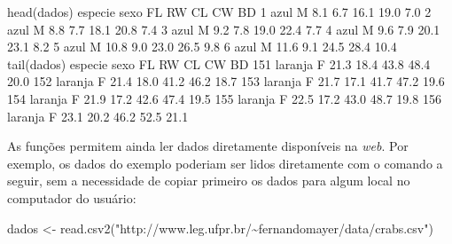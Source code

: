 \documentclass[
  10pt,
  a4paper]{book}
\newenvironment{Shaded}{\begin{snugshade}}{\end{snugshade}}
\newcommand{\DecValTok}[1]{\textcolor[rgb]{0.00,0.00,0.81}{#1}}
\newcommand{\FloatTok}[1]{\textcolor[rgb]{0.00,0.00,0.81}{#1}}
\newcommand{\FunctionTok}[1]{\textcolor[rgb]{0.00,0.00,0.00}{#1}}
\newcommand{\NormalTok}[1]{#1}
\newcommand{\OtherTok}[1]{\textcolor[rgb]{0.56,0.35,0.01}{#1}}
\newcommand{\StringTok}[1]{\textcolor[rgb]{0.31,0.60,0.02}{#1}}
\begin{document}
\begin{Shaded}
\begin{Highlighting}[]
\FunctionTok{head}\NormalTok{(dados)}
\NormalTok{  especie sexo   FL  RW   CL   CW   BD}
\DecValTok{1}\NormalTok{    azul    M  }\FloatTok{8.1} \FloatTok{6.7} \FloatTok{16.1} \FloatTok{19.0}  \FloatTok{7.0}
\DecValTok{2}\NormalTok{    azul    M  }\FloatTok{8.8} \FloatTok{7.7} \FloatTok{18.1} \FloatTok{20.8}  \FloatTok{7.4}
\DecValTok{3}\NormalTok{    azul    M  }\FloatTok{9.2} \FloatTok{7.8} \FloatTok{19.0} \FloatTok{22.4}  \FloatTok{7.7}
\DecValTok{4}\NormalTok{    azul    M  }\FloatTok{9.6} \FloatTok{7.9} \FloatTok{20.1} \FloatTok{23.1}  \FloatTok{8.2}
\DecValTok{5}\NormalTok{    azul    M }\FloatTok{10.8} \FloatTok{9.0} \FloatTok{23.0} \FloatTok{26.5}  \FloatTok{9.8}
\DecValTok{6}\NormalTok{    azul    M }\FloatTok{11.6} \FloatTok{9.1} \FloatTok{24.5} \FloatTok{28.4} \FloatTok{10.4}
\FunctionTok{tail}\NormalTok{(dados)}
\NormalTok{    especie sexo   FL   RW   CL   CW   BD}
\DecValTok{151}\NormalTok{ laranja    F }\FloatTok{21.3} \FloatTok{18.4} \FloatTok{43.8} \FloatTok{48.4} \FloatTok{20.0}
\DecValTok{152}\NormalTok{ laranja    F }\FloatTok{21.4} \FloatTok{18.0} \FloatTok{41.2} \FloatTok{46.2} \FloatTok{18.7}
\DecValTok{153}\NormalTok{ laranja    F }\FloatTok{21.7} \FloatTok{17.1} \FloatTok{41.7} \FloatTok{47.2} \FloatTok{19.6}
\DecValTok{154}\NormalTok{ laranja    F }\FloatTok{21.9} \FloatTok{17.2} \FloatTok{42.6} \FloatTok{47.4} \FloatTok{19.5}
\DecValTok{155}\NormalTok{ laranja    F }\FloatTok{22.5} \FloatTok{17.2} \FloatTok{43.0} \FloatTok{48.7} \FloatTok{19.8}
\DecValTok{156}\NormalTok{ laranja    F }\FloatTok{23.1} \FloatTok{20.2} \FloatTok{46.2} \FloatTok{52.5} \FloatTok{21.1}
\end{Highlighting}
\end{Shaded}

As funções permitem ainda ler dados diretamente disponíveis na
\emph{web}. Por exemplo, os dados do exemplo poderiam ser lidos diretamente
com o comando a seguir, sem a necessidade de copiar primeiro os dados para
algum local no computador do usuário:

\begin{Shaded}
\begin{Highlighting}[]
\NormalTok{dados }\OtherTok{\textless{}{-}} \FunctionTok{read.csv2}\NormalTok{(}\StringTok{"http://www.leg.ufpr.br/\textasciitilde{}fernandomayer/data/crabs.csv"}\NormalTok{)}
\end{Highlighting}
\end{Shaded}
\end{document}
